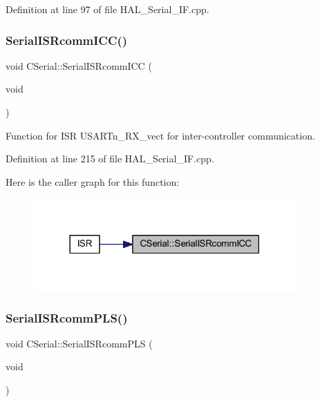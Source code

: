 Definition at line 97 of file H\+A\+L\+\_\+\+Serial\+\_\+\+I\+F.\+cpp.

\mbox{\label{class_c_serial_a974812db5ced18cb9a6a73dc9034e7c8}} 
\subsubsection{\texorpdfstring{Serial\+I\+S\+Rcomm\+I\+C\+C()}{SerialISRcommICC()}}
{\footnotesize\ttfamily void C\+Serial\+::\+Serial\+I\+S\+Rcomm\+I\+CC (\begin{DoxyParamCaption}\item[{void}]{ }\end{DoxyParamCaption})}



Function for I\+SR U\+S\+A\+R\+Tn\+\_\+\+R\+X\+\_\+vect for inter-\/controller communication. 



Definition at line 215 of file H\+A\+L\+\_\+\+Serial\+\_\+\+I\+F.\+cpp.

Here is the caller graph for this function\+:
\nopagebreak
\begin{figure}[H]
\begin{center}
\leavevmode
\includegraphics[width=285pt]{class_c_serial_a974812db5ced18cb9a6a73dc9034e7c8_icgraph}
\end{center}
\end{figure}
\mbox{\label{class_c_serial_a707841754d94fc1ab6679f52bf413d85}} 
\subsubsection{\texorpdfstring{Serial\+I\+S\+Rcomm\+P\+L\+S()}{SerialISRcommPLS()}}
{\footnotesize\ttfamily void C\+Serial\+::\+Serial\+I\+S\+Rcomm\+P\+LS (\begin{DoxyParamCaption}\item[{void}]{ }\end{DoxyParamCaption})}



